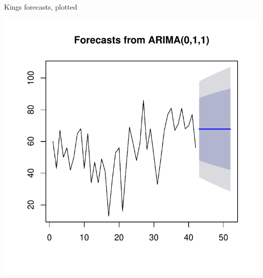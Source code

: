 \begin{frame}[fragile]{Kings forecasts, plotted}
  
\begin{knitrout}
\color{fgcolor}\begin{kframe}
\begin{alltt}
\end{alltt}
\end{kframe}
\includegraphics[width=\maxwidth]{figure/dob-1} 

\end{knitrout}
  
\end{frame}

